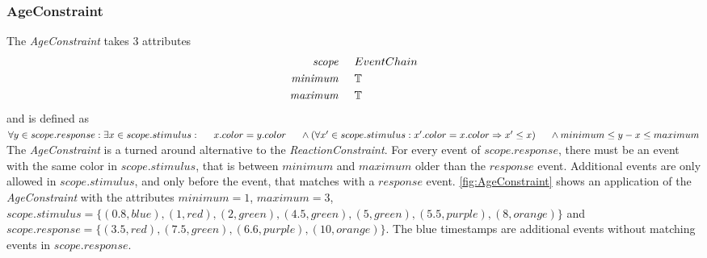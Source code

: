 	\subsubsection{AgeConstraint}
		The \emph{AgeConstraint} takes 3 attributes
		\begin{align*}
			\emph{scope} 	& \hspace{.5cm} EventChain\\
			\emph{minimum}	& \hspace{.5cm} \mathbb{T}\\
			\emph{maximum}	& \hspace{.5cm} \mathbb{T}
		\end{align*}
		and is defined as \\[10pt]
		\begin{math}
			\forall y\in scope.response: \exists x\in scope.stimulus:\\
			\text{\hspace{.5cm}}x.color=y.color\\
			\text{\hspace{.5cm}}\land (\forall x'\in scope.stimulus: x'.color=x.color\Rightarrow x'\leq x)\\
			\text{\hspace{.5cm}}\land minimum \leq y-x \leq maximum
		\end{math}\\[10pt]
		The \emph{AgeConstraint} is a turned around alternative to the \emph{ReactionConstraint}. For every event of $scope.response$, there must be an event with the same color in $scope.stimulus$, that is between $minimum$ and $maximum$ older than the $response$ event. Additional events are only allowed in $scope.stimulus$, and only before the event, that matches with a $response$ event.
		\ref{fig:AgeConstraint} shows an application of the \emph{AgeConstraint} with the attributes $minimum=1$, $maximum=3$,\\
		$scope.stimulus=\{(0.8, blue), (1, red), (2, green), (4.5, green), (5, green), (5.5, purple), (8, orange)\}$ and $scope.response=\{(3.5, red), (7.5, green), (6.6, purple), (10, orange)\}$. The blue timestamps are additional events without matching events in $scope.response$.
